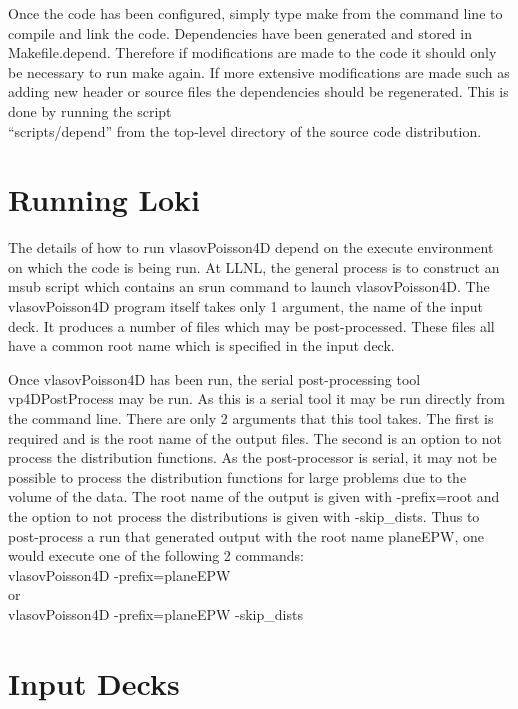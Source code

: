 \documentclass[11pt]{amsart}
\begin{document}
Once the code has been configured, simply type make from the command line to
compile and link the code.  Dependencies have been generated and stored in
Makefile.depend.  Therefore if modifications are made to the code it should
only be necessary to run make again.  If more extensive modifications are made
such as adding new header or source files the dependencies should be
regenerated.  This is done by running the script \\
``scripts/depend'' from the top-level directory of the source code
distribution.

\section*{Running Loki}
The details of how to run vlasovPoisson4D depend on the execute environment on
which the code is being run.  At LLNL, the general process is to construct an
msub script which contains an srun command to launch vlasovPoisson4D.  The
vlasovPoisson4D program itself takes only 1 argument, the name of the input
deck.  It produces a number of files which may be post-processed.  These files
all have a common root name which is specified in the input deck.

Once vlasovPoisson4D has been run, the serial post-processing tool
vp4DPostProcess may be run.  As this is a serial tool it may be run directly
from the command line.  There are only 2 arguments that this tool takes.  The
first is required and is the root name of the output files.  The second is an
option to not process the distribution functions.  As the post-processor is
serial, it may not be possible to process the distribution functions for large
problems due to the volume of the data.  The root name of the output is given
with -prefix=root and the option to not process the distributions is given with
-skip\_dists.  Thus to post-process a run that generated output with the root
name planeEPW, one would execute one of the following 2 commands: \\
vlasovPoisson4D -prefix=planeEPW \\
or \\
vlasovPoisson4D -prefix=planeEPW -skip\_dists

\section*{Input Decks}
\end{document}
